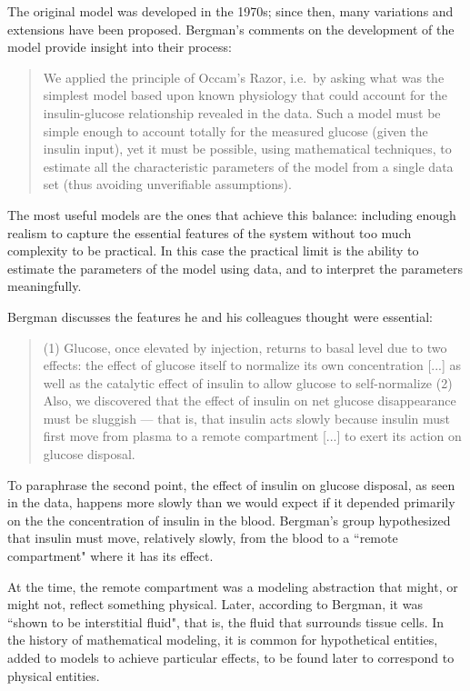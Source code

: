 \documentclass[12pt]{book}
\theoremstyle{exercise}
\begin{document}

The original model was developed in the 1970s; since then, many variations and extensions have been proposed.  Bergman's comments on the development of the model provide insight into their process:

\begin{quote}
We applied the principle of Occam's Razor, i.e.~by asking
what was the simplest model based upon known physiology
that could account for the insulin-glucose relationship
revealed in the data. Such a model must be simple
enough to account totally for the measured glucose (given
the insulin input), yet it must be possible, using mathematical
techniques, to estimate all the characteristic parameters
of the model from a single data set (thus avoiding
unverifiable assumptions).
\end{quote}

The most useful models are the ones that achieve this balance: including enough realism to capture the essential features of the system without too much complexity to be practical.  In this case the practical limit is the ability to estimate the parameters of the model using data, and to interpret the parameters meaningfully.


Bergman discusses the features he and his colleagues thought were essential:

\begin{quote}
(1) Glucose, once elevated by injection, returns to basal level due to
two effects: the effect of glucose itself to normalize its own
concentration [...] as well as the catalytic effect of insulin to allow
glucose to self-normalize (2) Also, we discovered
that the effect of insulin on net glucose disappearance
must be sluggish --- that is, that insulin acts slowly because
insulin must first move from plasma to a remote compartment [...] to exert its action on glucose disposal.
\end{quote}

To paraphrase the second point, the effect of insulin on glucose disposal, as seen in the data, happens more slowly than we would expect if it depended primarily on the the concentration of insulin in the blood.  Bergman's group hypothesized that insulin must move, relatively slowly, from the blood to a ``remote compartment" where it has its effect.


At the time, the remote compartment was a modeling abstraction that might, or might not, reflect something physical.  Later, according to Bergman, it was ``shown to be interstitial fluid", that is, the fluid that surrounds tissue cells.  In the history of mathematical modeling, it is common for hypothetical entities, added to models to achieve particular effects, to be found later to correspond to physical entities.
\end{document}
